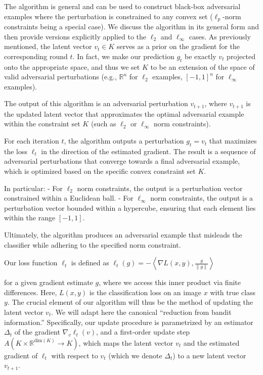 The algorithm is general and can be used to construct black-box adversarial examples where the perturbation is constrained to any convex set ($\ell_p$-norm constraints being a special case). We discuss the algorithm in its general form and then provide versions explicitly applied to the $\ell_2$ and $\ell_\infty$ cases. As previously mentioned, the latent vector $v_t \in K$ serves as a prior on the gradient for the corresponding round $t$. In fact, we make our prediction $g_t$ be exactly $v_t$ projected onto the appropriate space, and thus we set $K$ to be an extension of the space of valid adversarial perturbations (e.g., $\mathbb{R}^n$ for $\ell_2$ examples, $[-1, 1]^n$ for $\ell_\infty$ examples).

The output of this algorithm is an adversarial perturbation $v_{t+1}$, where $v_{t+1}$ is the updated latent vector that approximates the optimal adversarial example within the constraint set $K$ (such as $\ell_2$ or $\ell_\infty$ norm constraints). 

For each iteration $t$, the algorithm outputs a perturbation $g_t = v_t$ that maximizes the loss $\ell_t$ in the direction of the estimated gradient. The result is a sequence of adversarial perturbations that converge towards a final adversarial example, which is optimized based on the specific convex constraint set $K$.

In particular:
- For $\ell_2$ norm constraints, the output is a perturbation vector constrained within a Euclidean ball.
- For $\ell_\infty$ norm constraints, the output is a perturbation vector bounded within a hypercube, ensuring that each element lies within the range $[-1, 1]$.

Ultimately, the algorithm produces an adversarial example that misleads the classifier while adhering to the specified norm constraint.


Our loss function $\ell_t$ is defined as
$\ell_t(g) = -\left\langle \nabla L(x, y), \frac{g}{\|g\|} \right\rangle$

for a given gradient estimate $g$, where we access this inner product via finite differences. Here, $L(x, y)$ is the classification loss on an image $x$ with true class $y$. The crucial element of our algorithm will thus be the method of updating the latent vector $v_t$. We will adapt here the canonical “reduction from bandit information.” Specifically, our update procedure is parametrized by an estimator $\Delta_t$ of the gradient $\nabla_v \ell_t(v)$, and a first-order update step $A (K \times \mathbb{R}^{\text{dim}(K)} \to K)$, which maps the latent vector $v_t$ and the estimated gradient of $\ell_t$ with respect to $v_t$ (which we denote $\Delta_t$) to a new latent vector $v_{t+1}$. 


